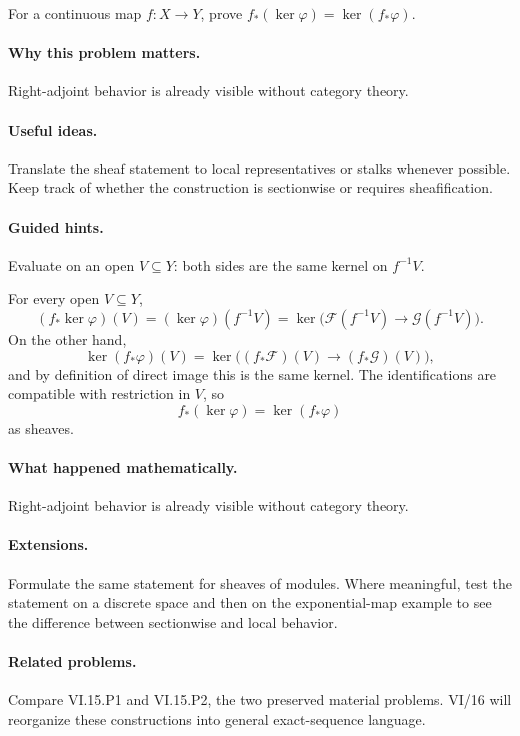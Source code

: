 \begin{problem}\label{prob:vi15-p14}
For a continuous map $f:X\to Y$, prove $f_*(\ker\varphi)=\ker(f_*\varphi)$.
\end{problem}

\ifdefined\FullProblemDossiers
\paragraph{Why this problem matters.}
Right-adjoint behavior is already visible without category theory.

\paragraph{Useful ideas.}
Translate the sheaf statement to local representatives or stalks whenever possible.  Keep track of whether the construction is sectionwise or requires sheafification.

\paragraph{Guided hints.}
Evaluate on an open $V\subseteq Y$: both sides are the same kernel on $f^{-1}V$.

\begin{solution}
For every open $V\subseteq Y$,
\[
(f_*\ker\varphi)(V)
=(\ker\varphi)(f^{-1}V)
=\ker\bigl(\mathcal F(f^{-1}V)\to\mathcal G(f^{-1}V)\bigr).
\]
On the other hand,
\[
\ker(f_*\varphi)(V)
=\ker\bigl((f_*\mathcal F)(V)\to(f_*\mathcal G)(V)\bigr),
\]
and by definition of direct image this is the same kernel. The identifications are compatible with restriction in $V$, so
\[
f_*(\ker\varphi)=\ker(f_*\varphi)
\]
as sheaves.
\end{solution}

\paragraph{What happened mathematically.}
Right-adjoint behavior is already visible without category theory.

\paragraph{Extensions.}
Formulate the same statement for sheaves of modules.  Where meaningful, test the statement on a discrete space and then on the exponential-map example to see the difference between sectionwise and local behavior.

\paragraph{Related problems.}
Compare VI.15.P1 and VI.15.P2, the two preserved material problems.  VI/16 will reorganize these constructions into general exact-sequence language.
\fi
